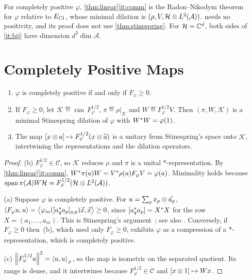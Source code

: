 \documentclass[12pt]{article}
\newcommand{\alg}{\mathcal{A}}             %
\newcommand{\hilb}{\mathcal{H}}            %
\newcommand{\dil}{\mathcal{K}}             %
\newcommand{\ip}[2]{\left\langle #1 , #2 \right\rangle}
\newcommand{\ipphi}[2]{\left\langle #1 , #2 \right\rangle_{\varphi}}
\newcommand{\Ltwo}{L^2\br{\alg}}
\newcommand{\vect}[1]{\widehat{#1}}
\newcommand{\Ltn}{\hilb \tensor \Ltwo}
\newcommand{\Fphi}{F_{\varphi}}
\newcommand{\comm}{\mathcal{C}}            %
\newcommand{\Esc}{E_{\complex 1}}          %
\newcommand{\ran}{\operatorname{ran}}
\begin{document}
\begin{remark}
\label{rem:rn}
For completely positive \(\varphi\), \cref{thm:linear}\ref{it:comm} is the
Radon--Nikodym theorem~\cite{Arveson1969,BelavkinStaszewski1986} for \(\varphi\)
relative to \(\Esc\), whose minimal dilation is \((\rho, V, \Ltn)\).
 needs no positivity, and its proof does not use
\cref{thm:stinespring}. For \(\hilb = \complex^d\), both sides of
\ref{it:bij} have dimension \(d^2\dim\alg\).
\end{remark}

\section{Completely Positive Maps}
\label{sec:cp}

\begin{theorem}
\label{thm:cp}
\begin{enumerate}[label=(\alph*)]
  \item \label{it:pos}
    \(\varphi\) is completely positive if and only if \(\Fphi \ge 0\).
  \item \label{it:dil}
    If \(\Fphi \ge 0\), let \(\dil \eqdef \overline{\ran}\,\Fphi^{1/2}\),
    \(\pi \eqdef \rho|_{\dil}\) and \(W \eqdef \Fphi^{1/2}V\). Then \((\pi, W, \dil)\)
    is a minimal Stinespring dilation of \(\varphi\) with \(W^* W = \varphi(1)\).
  \item \label{it:compare}
    The map \([x \tensor a] \mapsto \Fphi^{1/2}(x \tensor \vect a)\) is a unitary
    from Stinespring's space onto \(\dil\), intertwining the representations and
    the dilation operators.
\end{enumerate}
\end{theorem}
\begin{proof}
(b) \(\Fphi^{1/2} \in \comm\), so \(\dil\) reduces \(\rho\) and \(\pi\) is a unital
\(*\)-representation. By \cref{thm:linear}\ref{it:comm},
\(W^\adjoint\pi(a)W = V^\adjoint\rho(a)\Fphi V = \varphi(a)\). Minimality holds
because \(\Span\pi(\alg)W\hilb = \Fphi^{1/2}(\Ltn)\).

(a) Suppose \(\varphi\) is completely positive. For
\(u = \sum_p x_p \tensor \vect{a_p}\), \(\ip{\Fphi u}{u} =
\ip{\varphi_m([a_q^\adjoint a_p]_{q,p})\vec x}{\vec x} \ge 0\), since
\([a_q^* a_p] = X^* X\) for the row \(X = (a_1, \dots, a_m)\). This is
Stinespring's argument~\cite{Stinespring1955}; see also
\cite[Theorem~4.1]{Paulsen2002}. Conversely, if \(\Fphi \ge 0\) then~(b), which
used only \(\Fphi \ge 0\), exhibits \(\varphi\) as a compression of a
\(*\)-representation, which is completely positive.

(c) \(\norm{\Fphi^{1/2}u}^2 = \ipphi uu\), so the map is isometric on the
separated quotient. Its range is dense, and it intertwines because
\(\Fphi^{1/2} \in \comm\) and \([x \otimes 1] \mapsto Wx\).
\end{proof}
\end{document}
